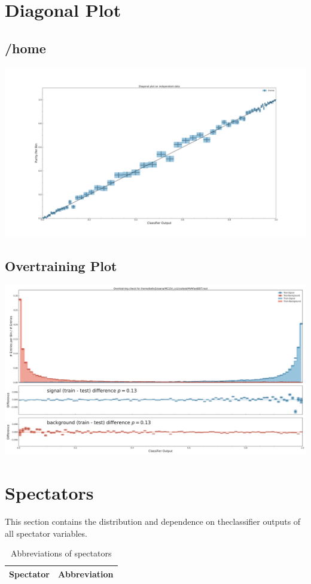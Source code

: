 \documentclass[10pt,a4paper]{article}
\begin{document}
\section{Diagonal Plot}
\subsection{/home}
\begin{center}
\includegraphics[width=1.0\textwidth]{diagonal_plot_test.pdf}
\end{center}
\subsection{Overtraining Plot}
\begin{center}
\includegraphics[width=1.0\textwidth]{overtraining_plot_-6845103939654726996.pdf}
\end{center}
\raggedbottom
\pagebreak[0]
\FloatBarrier
\section{Spectators}
This section contains the distribution and dependence on theclassifier outputs of all spectator variables.\begin{center}
\begin{longtable}{ll}
\caption{Abbreviations of spectators}\\
\toprule
Spectator & Abbreviation\\
\midrule
\bottomrule
\end{longtable}
\end{center}
\end{document}
